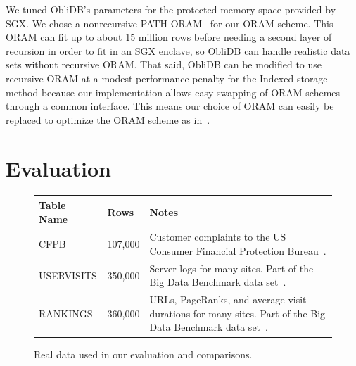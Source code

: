 \documentclass[letterpaper,twocolumn,10pt]{article}
\def\name/{ObliDB}
\begin{document}
We tuned ObliDB's parameters for the protected memory space provided by SGX. We chose a nonrecursive PATH ORAM~\cite{SDS+13} for our ORAM scheme. This ORAM can fit up to about 15 million rows before needing a second layer of recursion in order to fit in an SGX enclave, so \name/ can handle realistic data sets without recursive ORAM. That said, \name/ can be modified to use recursive ORAM at a modest performance penalty for the Indexed storage method because our implementation allows easy swapping of ORAM schemes through a common interface. This means our choice of ORAM can easily be replaced to optimize the ORAM scheme as in~\cite{ZWR+16}.

\section{Evaluation}\label{eval}
\begin{figure}
\small
\centering
\begin{tabular}{llp{3.5cm}}
\textbf{Table Name} & \textbf{Rows} & \textbf{Notes} \\\hline\rule{0pt}{2ex}
CFPB & 107,000 & Customer complaints to the US Consumer Financial Protection Bureau~\cite{CFPB}.\\
USERVISITS & 350,000 & Server logs for many sites. Part of the Big Data Benchmark data set~\cite{BDB}.\\
RANKINGS & 360,000 & URLs, PageRanks, and average visit durations for many sites. Part of the Big Data Benchmark data set~\cite{BDB}.\\
\end{tabular}
\caption{\small Real data used in our evaluation and comparisons.}
\label{tabletable}
\end{figure}
\end{document}
